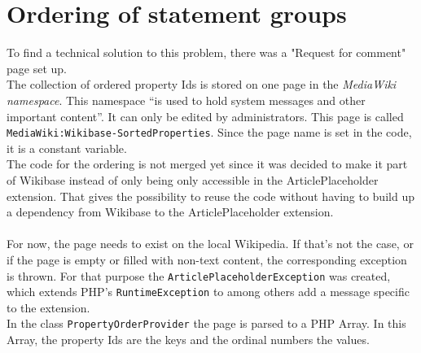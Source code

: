 \section{Ordering of statement groups}\label{ordering-stat}

To find a technical solution to this problem, there was a "Request for comment" page set up. \citep{wiki:24} \\

The collection of ordered property Ids is stored on one page in the \textit{MediaWiki namespace}. This namespace ``is used to hold system messages and other important content''. \citep{wiki:17} It can only be edited by administrators. This page is called \texttt{\justify MediaWiki:Wikibase-SortedProperties}. Since the page name is set in the code, it is a constant variable. \\
The code for the ordering is not merged yet since it was decided to make it part of Wikibase instead of only being only accessible in the ArticlePlaceholder extension. That gives the possibility to reuse the code without having to build up a dependency from Wikibase to the ArticlePlaceholder extension. \\
\\
For now, the page needs to exist on the local Wikipedia. If that's not the case, or if the page is empty or filled with non-text content, the corresponding exception is thrown. For that purpose the \texttt{\justify ArticlePlaceholderException} was created, which extends PHP's \texttt{\justify RuntimeException} to among others add a message specific to the extension. \\
In the class \texttt{\justify PropertyOrderProvider} the page is parsed to a PHP Array. In this Array, the property Ids are the keys and the ordinal numbers the values. \\

